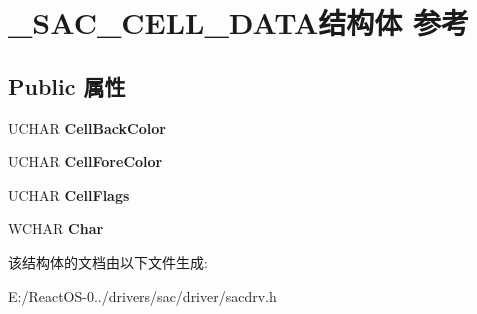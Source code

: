 \hypertarget{struct___s_a_c___c_e_l_l___d_a_t_a}{}\section{\+\_\+\+S\+A\+C\+\_\+\+C\+E\+L\+L\+\_\+\+D\+A\+T\+A结构体 参考}
\label{struct___s_a_c___c_e_l_l___d_a_t_a}
\subsection*{Public 属性}
\begin{DoxyCompactItemize}
\item 
\mbox{\label{struct___s_a_c___c_e_l_l___d_a_t_a_ab405cfdce7fd2219a966ac737c341845}} 
U\+C\+H\+AR {\bfseries Cell\+Back\+Color}
\item 
\mbox{\label{struct___s_a_c___c_e_l_l___d_a_t_a_af2cae2d507d6a1d14945ff7f135160bd}} 
U\+C\+H\+AR {\bfseries Cell\+Fore\+Color}
\item 
\mbox{\label{struct___s_a_c___c_e_l_l___d_a_t_a_affc12de6908ef5212e69820471bd57f3}} 
U\+C\+H\+AR {\bfseries Cell\+Flags}
\item 
\mbox{\label{struct___s_a_c___c_e_l_l___d_a_t_a_a4b046612bfe2fca8e5e2588cc3b51a10}} 
W\+C\+H\+AR {\bfseries Char}
\end{DoxyCompactItemize}


该结构体的文档由以下文件生成\+:\begin{DoxyCompactItemize}
\item 
E\+:/\+React\+O\+S-\/0../drivers/sac/driver/sacdrv.\+h\end{DoxyCompactItemize}
